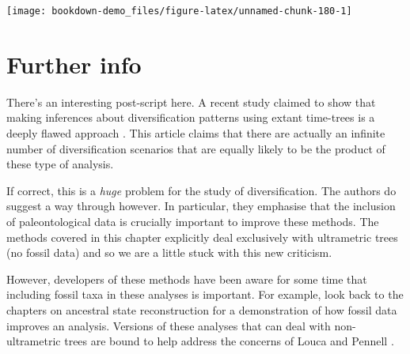 \documentclass[
]{book}
\newenvironment{Shaded}{\begin{snugshade}}{\end{snugshade}}
\newcommand{\DataTypeTok}[1]{\textcolor[rgb]{0.13,0.29,0.53}{#1}}
\newcommand{\DecValTok}[1]{\textcolor[rgb]{0.00,0.00,0.81}{#1}}
\newcommand{\KeywordTok}[1]{\textcolor[rgb]{0.13,0.29,0.53}{\textbf{#1}}}
\newcommand{\NormalTok}[1]{#1}
\newcommand{\OperatorTok}[1]{\textcolor[rgb]{0.81,0.36,0.00}{\textbf{#1}}}
\newcommand{\StringTok}[1]{\textcolor[rgb]{0.31,0.60,0.02}{#1}}
\begin{document}
\begin{Shaded}
\end{Shaded}

\begin{center}\texttt{[image: bookdown-demo\_files/figure-latex/unnamed-chunk-180-1]} \end{center}

\hypertarget{further-info-4}{%
\section{Further info}\label{further-info-4}}

There's an interesting post-script here. A recent study claimed to show that making inferences about diversification patterns using extant time-trees is a deeply flawed approach \citep{Louca20}. This article claims that there are actually an infinite number of diversification scenarios that are equally likely to be the product of these type of analysis.

If correct, this is a \emph{huge} problem for the study of diversification. The authors do suggest a way through however. In particular, they emphasise that the inclusion of paleontological data is crucially important to improve these methods. The methods covered in this chapter explicitly deal exclusively with ultrametric trees (no fossil data) and so we are a little stuck with this new criticism.

However, developers of these methods have been aware for some time that including fossil taxa in these analyses is important. For example, look back to the chapters on ancestral state reconstruction for a demonstration of how fossil data improves an analysis. Versions of these analyses that can deal with non-ultrametric trees are bound to help address the concerns of Louca and Pennell \citeyearpar{Louca20}.
\end{document}
